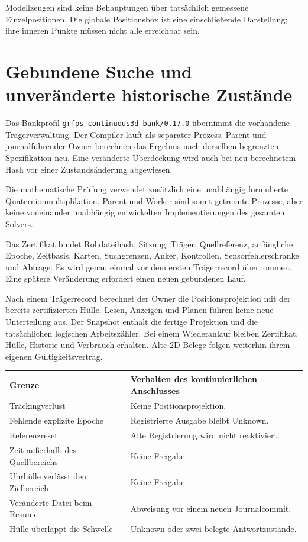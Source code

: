 \documentclass[11pt,a4paper]{article}
\newcommand{\nextsection}[2]{\clearpage{\color{accent}\small\textsf{#1}}\section{#2}}
\begin{document}
Modellzeugen sind keine Behauptungen über tatsächlich gemessene
Einzelpositionen. Die globale Positionsbox ist eine einschließende
Darstellung; ihre inneren Punkte müssen nicht alle erreichbar sein.

\nextsection{103 / BETRIEBSVERTRAG}{Gebundene Suche und unveränderte historische Zustände}
Das Bankprofil \texttt{grfps-continuous3d-bank/0.17.0}
übernimmt die vorhandene Trägerverwaltung. Der Compiler läuft
als separater Prozess. Parent und journalführender Owner
berechnen das Ergebnis nach derselben begrenzten Spezifikation
neu. Eine veränderte Überdeckung wird auch bei neu berechnetem
Hash vor einer Zustandsänderung abgewiesen.

Die mathematische Prüfung verwendet zusätzlich eine unabhängig
formulierte Quaternionmultiplikation. Parent und Worker sind
somit getrennte Prozesse, aber keine voneinander unabhängig
entwickelten Implementierungen des gesamten Solvers.

Das Zertifikat bindet Rohdateihash, Sitzung, Träger,
Quellreferenz, anfängliche Epoche, Zeitbasis, Karten, Suchgrenzen,
Anker, Kontrollen, Sensorfehlerschranke und Abfrage.
Es wird genau einmal vor dem ersten Trägerrecord übernommen.
Eine spätere Veränderung erfordert einen neuen gebundenen Lauf.

Nach einem Trägerrecord berechnet der Owner die Positionsprojektion
mit der bereits zertifizierten Hülle. Lesen, Anzeigen und Planen
führen keine neue Unterteilung aus. Der Snapshot enthält die
fertige Projektion und die tatsächlichen logischen Arbeitszähler.
Bei einem Wiederanlauf bleiben Zertifikat, Hülle, Historie und
Verbrauch erhalten. Alte 2D-Belege folgen weiterhin ihrem eigenen
Gültigkeitsvertrag.

\begin{tabularx}{\linewidth}{@{}lY@{}}\toprule
Grenze & Verhalten des kontinuierlichen Anschlusses\\\midrule
Trackingverlust & Keine Positionsprojektion.\\
Fehlende explizite Epoche & Registrierte Ausgabe bleibt Unknown.\\
Referenzreset & Alte Registrierung wird nicht reaktiviert.\\
Zeit außerhalb des Quellbereichs & Keine Freigabe.\\
Uhrhülle verlässt den Zielbereich & Keine Freigabe.\\
Veränderte Datei beim Resume & Abweisung vor einem neuen Journalcommit.\\
Hülle überlappt die Schwelle & Unknown oder zwei belegte Antwortzustände.\\\bottomrule
\end{tabularx}
\end{document}
